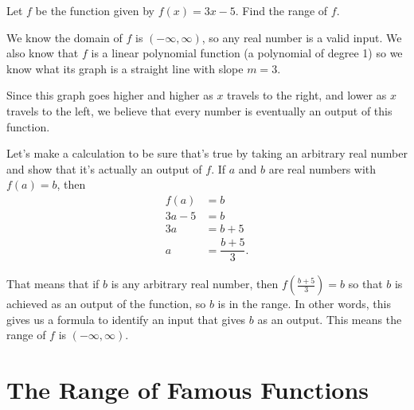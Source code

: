 \documentclass[nooutcomes]{ximera}
\begin{document}
	\begin{example}
		Let $f$ be the function given by $f(x) = 3x-5$. Find the range of $f$.
		
		\begin{explanation}
			We know the domain of $f$ is $(-\infty, \infty)$, so any real number is a valid input. We also know that $f$ is a linear polynomial function
			(a polynomial of degree 1) so we know what its graph is a straight line with slope $m = 3$.
			\begin{image}
			\end{image}
			Since this graph goes higher and higher as $x$ travels to the right, and lower as $x$ travels to the left, we believe that every number is 
			eventually an output of this function. 
			
			Let's make a calculation to be sure that's true by taking an arbitrary real number and show that it's actually an output of $f$.
			If $a$ and $b$ are real numbers with $f(a)=b$, then
			\begin{align*}
				f(a) &= b\\
				3a-5 &= b\\
				3a &= b + 5\\
				a &= \dfrac{b+5}{3}.
			\end{align*}
			
			That means that if $b$ is any arbitrary real number, then $f\left( \frac{b+5}{3} \right) = b$ so that $b$ is achieved as an output of the
			function, so $b$ is in the range. In other words, this gives us a formula to identify an input that gives $b$ as an output.
			This means the range of $f$ is $(-\infty, \infty)$.

		\end{explanation}
	\end{example}
	

\section{The Range of Famous Functions}
	
\end{document}
